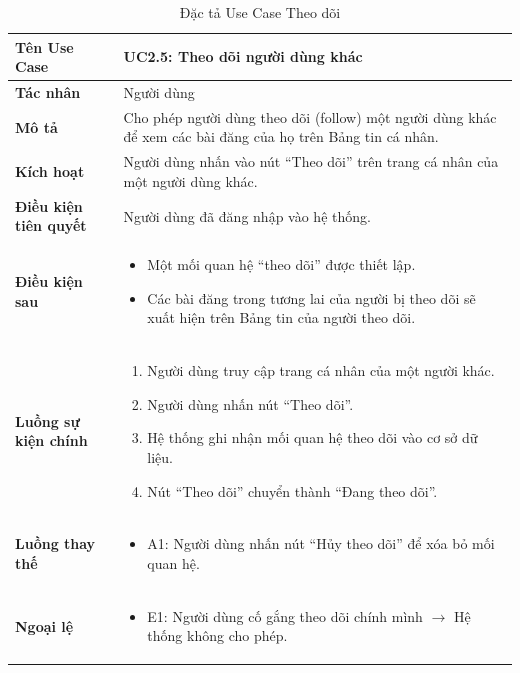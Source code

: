 \begin{table}[H]
\centering
\begin{tabularx}{\textwidth}{|l|X|}
\hline
\textbf{Tên Use Case} & \textbf{UC2.5: Theo dõi người dùng khác} \\ \hline
\textbf{Tác nhân} & Người dùng \\ \hline
\textbf{Mô tả} & Cho phép người dùng theo dõi (follow) một người dùng khác để xem các bài đăng của họ trên Bảng tin cá nhân. \\ \hline
\textbf{Kích hoạt} & Người dùng nhấn vào nút ``Theo dõi'' trên trang cá nhân của một người dùng khác. \\ \hline
\textbf{Điều kiện tiên quyết} & Người dùng đã đăng nhập vào hệ thống. \\ \hline
\textbf{Điều kiện sau} & 
\begin{itemize}
    \item Một mối quan hệ ``theo dõi'' được thiết lập.
    \item Các bài đăng trong tương lai của người bị theo dõi sẽ xuất hiện trên Bảng tin của người theo dõi.
\end{itemize} \\ \hline
\textbf{Luồng sự kiện chính} & 
\begin{enumerate}
    \item Người dùng truy cập trang cá nhân của một người khác.
    \item Người dùng nhấn nút ``Theo dõi''.
    \item Hệ thống ghi nhận mối quan hệ theo dõi vào cơ sở dữ liệu.
    \item Nút ``Theo dõi'' chuyển thành ``Đang theo dõi''.
\end{enumerate} \\ \hline
\textbf{Luồng thay thế} & 
\begin{itemize}
    \item A1: Người dùng nhấn nút ``Hủy theo dõi'' để xóa bỏ mối quan hệ.
\end{itemize} \\ \hline
\textbf{Ngoại lệ} & 
\begin{itemize}
    \item E1: Người dùng cố gắng theo dõi chính mình $\rightarrow$ Hệ thống không cho phép.
\end{itemize} \\ \hline
\end{tabularx}
\caption{Đặc tả Use Case Theo dõi}
\end{table}

